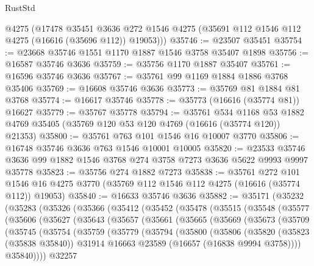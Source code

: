 \begin{lexlean}{RustStd}
\begin{coremodule}
      @4275
      (@17478
        @35451
        @3636
        @272
        @1546
        @4275
        (@35691 @112 @1546 @112 @4275 (@16616 (@35696 @112)) @19053)))
@35746 := @23507 @35451
@35754 := @23668 @35746 @1551 @1170 @1887 @1546 @3758 @35407 @1898
@35756 := @16587 @35746 @3636
@35759 := @35756 @1170 @1887 @35407
@35761 := @16596 @35746 @3636
@35767 := @35761 @99 @1169 @1884 @1886 @3768 @35406
@35769 := @16608 @35746 @3636
@35773 := @35769 @81 @1884 @81 @3768
@35774 := @16617 @35746
@35778 := @35773 (@16616 (@35774 @81)) @16627
@35779 := @35767 @35778
@35794 := @35761
    @534
    @1168
    @53
    @1882
    @4769
    @35405
    (@35769 @120 @53 @120 @4769 (@16616 (@35774 @120)) @21353)
@35800 := @35761 @763 @101 @1546 @16 @10007 @3770
@35806 := @16748 @35746 @3636 @763 @1546 @10001 @10005
@35820 := @23533 @35746 @3636 @99 @1882 @1546 @3768 @274 @3758 @7273 @3636 @5622 @9993 @9997 @35778
@35823 := @35756 @274 @1882 @7273
@35838 := @35761
    @272
    @101
    @1546
    @16
    @4275
    @3770
    (@35769 @112 @1546 @112 @4275 (@16616 (@35774 @112)) @19053)
@35840 := @16633 @35746 @3636
@35882 := @35171
    (@35232
      (@35283
        (@35326
          (@35366
            (@35412
              (@35452
                (@35478
                  (@35515
                    (@35548
                      (@35577
                        (@35606
                          (@35627
                            (@35643
                              (@35657
                                (@35661
                                  (@35665
                                    (@35669
                                      (@35673
                                        (@35709
                                          (@35745
                                            (@35754
                                              (@35759
                                                (@35779
                                                  (@35794
                                                    (@35800
                                                      (@35806
                                                        (@35820
                                                          (@35823 (@35838 @35840))
                                                          @31914
                                                          @16663
                                                          @23589
                                                          (@16657 (@16838 @9994 @3758))))
                                                      @35840))))
                                              @32257

\end{coremodule}
\end{lexlean}
